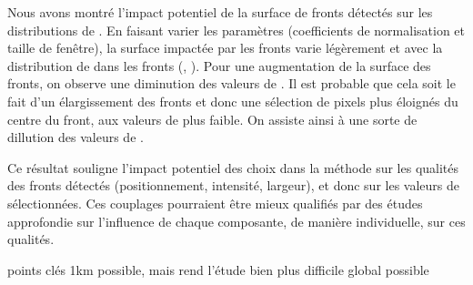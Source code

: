 Nous avons montré l'impact potentiel de la surface de fronts détectés sur les distributions de .
En faisant varier les paramètres (coefficients de normalisation et taille de fenêtre), la surface impactée par les fronts varie légèrement et avec la distribution de  dans les fronts (, ).
Pour une augmentation de la surface des fronts, on observe une diminution des valeurs de .
Il est probable que cela soit le fait d'un élargissement des fronts et donc une sélection de pixels plus éloignés du centre du front, aux valeurs de  plus faible.
On assiste ainsi à une sorte de dillution des valeurs de .

Ce résultat souligne l'impact potentiel des choix dans la méthode sur les qualités des fronts détectés (positionnement, intensité, largeur), et donc sur les valeurs de  sélectionnées.
Ces couplages pourraient être mieux qualifiés par des études approfondie sur l'influence de chaque composante, de manière individuelle, sur ces qualités.


points clés
1km possible, mais rend l'étude bien plus difficile
global possible


